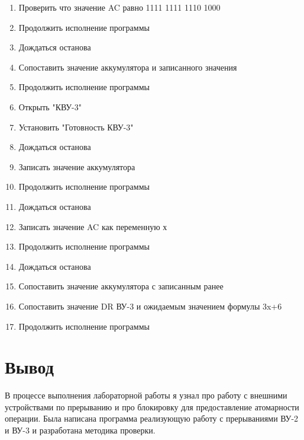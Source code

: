 \documentclass[12pt]{article}
\begin{document}
\begin{enumerate}[]
		\item Проверить что значение AC равно 1111 1111 1110 1000
		\item Продолжить исполнение программы
        \item Дождаться останова
        \item Сопоставить значение аккумулятора и записанного значения
        \item Продолжить исполнение программы
		\item Открыть "КВУ-3"
		\item Установить "Готовность КВУ-3"
		\item Дождаться останова
        \item Записать значение аккумулятора
        \item Продолжить исполнение программы
        \item Дождаться останова
		\item Записать значение AC как переменную х
		\item Продолжить исполнение программы
        \item Дождаться останова
        \item Сопоставить значение аккумулятора с записанным ранее
		\item Сопоставить значение DR ВУ-3 и ожидаемым значением формулы 3x+6
        \item Продолжить исполнение программы
	 \end{enumerate}
 	\newpage
 
 	\section{Вывод}
 	В процессе выполнения лабораторной работы я узнал про работу с внешними устройствами по прерыванию и про блокировку для предоставление атомарности операции. Была написана программа реализующую работу с прерываниями ВУ-2 и ВУ-3 и разработана методика проверки. 
\end{document}
